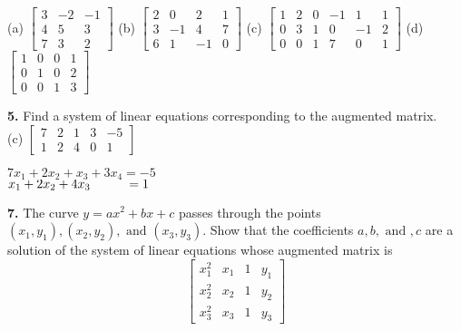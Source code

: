 \documentclass[addpoints]{exam}
\begin{document}
\begin{questions}
\begin{solution}
        (a) $\begin{bmatrix}
            3 & -2 & -1 \\ 
            4 & 5 & 3 \\ 
            7 & 3 & 2    
        \end{bmatrix}$ 
        (b) $ \begin{bmatrix}
            2 & 0 & 2 & 1 \\ 
            3 & -1 & 4 & 7 \\ 
            6 & 1 & -1 & 0
        \end{bmatrix} $
        (c) $ \begin{bmatrix}
            1 & 2 & 0 & -1 & 1 & 1 \\ 
            0 & 3 & 1 & 0 & -1 & 2 \\ 
            0 & 0 & 1 & 7 & 0 & 1
        \end{bmatrix} $
        (d) $ \begin{bmatrix}
            1 & 0 & 0 & 1 \\ 
            0 & 1 & 0 & 2 \\ 
            0 & 0 & 1 & 3
        \end{bmatrix} $
    \end{solution}
    \question
    \textbf{5. } Find a system of linear equations corresponding to the augmented matrix. \\ 
    (c) $ \begin{bmatrix}
        7 & 2 & 1 & 3 & -5 \\ 
        1 & 2 & 4 & 0 & 1
    \end{bmatrix} $
    \begin{solution}
        
        $ 7x_1 + 2x_2 + x_3 + 3x_4 = -5 $ \\ 
        $ x_1 + 2x_2 + 4x_3 \text{\hspace{9.75mm}} = 1 $
    \end{solution}

    \question
    \textbf{7.} The curve $ y = ax^2 + bx + c $ passes through the points $ (x_1, y_1), (x_2, y_2), \text{ and } (x_3, y_3) $. Show that the coefficients $ a, b, \text{ and }, c $ are a solution of the system of linear equations whose augmented matrix is 
    $$ \begin{bmatrix}
        x_{1}^{2} & x_1 & 1 & y_1 \\ 
        x_{2}^{2} & x_2 & 1 & y_2 \\ 
        x_{3}^{2} & x_3 & 1 & y_3
    \end{bmatrix} $$
    \begin{solution}
        

\end{solution}
\end{questions}
\end{document}
